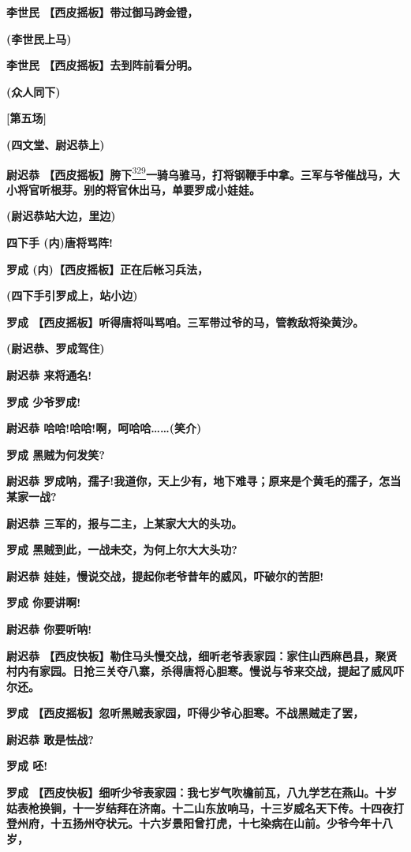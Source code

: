 \textbf{李世民 【西皮摇板】带过御马跨金镫，}

\textbf{(李世民上马)}

\textbf{李世民 【西皮摇板】去到阵前看分明。}

\textbf{(众人同下)}

\textbf{{[}第五场{]}}

\textbf{(四文堂、尉迟恭上)}

\textbf{尉迟恭
【西皮摇板】胯下}\protect\hyperlink{fn329}{\textsuperscript{329}}\textbf{一骑乌骓马，打将钢鞭手中拿。三军与爷催战马，大小将官听根芽。别的将官休出马，单要罗成小娃娃。}

\textbf{(尉迟恭站大边，里边)}

\textbf{四下手 (内)唐将骂阵!}

\textbf{罗成 (内)【西皮摇板】正在后帐习兵法，}

\textbf{(四下手引罗成上，站小边)}

\textbf{罗成
【西皮摇板】听得唐将叫骂咱。三军带过爷的马，管教敌将染黄沙。　}

\textbf{(尉迟恭、罗成驾住)}

\textbf{尉迟恭 来将通名!}

\textbf{罗成 少爷罗成!}

\textbf{尉迟恭 哈哈!哈哈!啊，呵哈哈\ldots{}\ldots{}(笑介)}

\textbf{罗成 黑贼为何发笑?}

\textbf{尉迟恭
罗成呐，孺子!我道你，天上少有，地下难寻；原来是个黄毛的孺子，怎当某家一战?}

\textbf{尉迟恭 三军的，报与二主，上某家大大的头功。}

\textbf{罗成 黑贼到此，一战未交，为何上尔大大头功?}

\textbf{尉迟恭 娃娃，慢说交战，提起你老爷昔年的威风，吓破尔的苦胆!}

\textbf{罗成 你要讲啊!}

\textbf{尉迟恭 你要听呐!}

\textbf{尉迟恭
【西皮快板】勒住马头慢交战，细听老爷表家园：家住山西麻邑县，聚贤村内有家园。日抢三关夺八寨，杀得唐将心胆寒。慢说与爷来交战，提起了威风吓尔还。}

\textbf{罗成
【西皮摇板】忽听黑贼表家园，吓得少爷心胆寒。不战黑贼走了罢，}

\textbf{尉迟恭 敢是怯战?}

\textbf{罗成 呸!}

\textbf{罗成
【西皮快板】细听少爷表家园：我七岁气吹檐前瓦，八九学艺在燕山。十岁姑表枪换锏，十一岁结拜在济南。十二山东放响马，十三岁威名天下传。十四夜打登州府，十五扬州夺状元。十六岁景阳曾打虎，十七染病在山前。少爷今年十八岁，}

